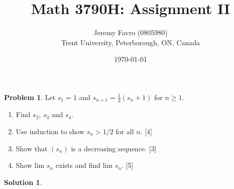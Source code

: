 \documentclass[10pt]{article}
\title{Math 3790H: Assignment II}
\author{Jeremy Favro (0805980) \\ Trent University, Peterborough, ON, Canada}
\date{\today}
\theoremstyle{definition}
\newtheorem{problem}{Problem}
\newtheorem{soln}{Solution}
\begin{document}
\maketitle

\begin{problem}
Let $s_1 = 1$ and $s_{n+1} = \frac{1}{3} (s_n + 1)$ for $n \geq 1$.
\begin{enumerate}[label=(\alph*)]
  \item Find $s_2$, $s_3$ and $s_4$.
  \item Use induction to show $s_n > 1/2$ for all $n$. [4]
  \item Show that $(s_n)$ is a decreasing sequence. [3]
  \item Show lim $s_n$ exists and find lim $s_n$. [5]
\end{enumerate}
\end{problem}
\begin{soln}

\end{soln}
\end{document}

